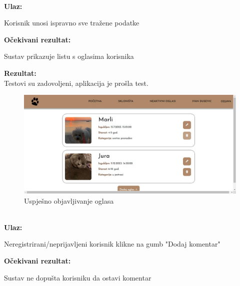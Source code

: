 			\noindent {}\\
			\textbf{Ulaz: }	
			\begin{packed_enum}
				\item Korisnik unosi ispravno sve tražene podatke
				
			\end{packed_enum}
			
			\noindent \textbf{Očekivani rezultat:}
			
			\begin{packed_enum}
				\item Sustav prikazuje listu s oglasima korisnika
				
			\end{packed_enum}
			
			\noindent \textbf{Rezultat:}\\
			Testovi su zadovoljeni, aplikacija je prošla test.\\
			\begin{figure}[H]
				\includegraphics[width=\textwidth]{uspjesno_objavljivanje_oglasa.JPEG}
				\centering
				\caption{Uspješno objavljivanje oglasa}
				\label{fig:uspjesnoobjavljivanjeoglasa}
			\end{figure}
			
			\noindent {}\\
			\textbf{Ulaz: }	
			\begin{packed_enum}
				\item Neregistrirani/neprijavljeni korisnik klikne na gumb "Dodaj komentar"
				
			\end{packed_enum}
			
			\noindent \textbf{Očekivani rezultat:}
			
			\begin{packed_enum}
				\item Sustav ne dopušta korisniku da ostavi komentar
				
			\end{packed_enum}
			
